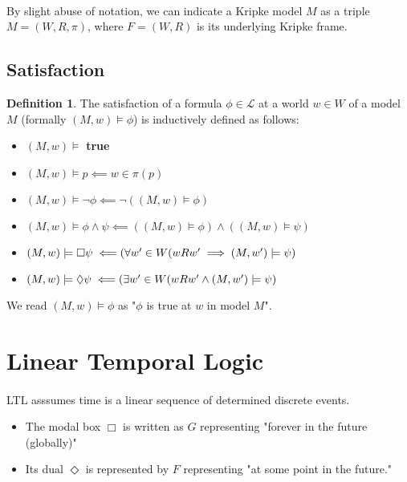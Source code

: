 \documentclass{article}
\theoremstyle{plain}
\theoremstyle{definition}
\newtheorem{defn}[thm]{Definition} %
\begin{document}
\begin{multicols}{2}
\paragraph{} By slight abuse of notation, we can indicate a Kripke model $M$ as a triple $M = (W, R, \pi)$, where $F = (W, R)$ is its underlying Kripke frame. 

\subsection{Satisfaction}

\begin{defn}The satisfaction of a formula $\phi\in\mathcal{L}$ at a world $w\in W$ of a model $M$ (formally $(M, w) \models \phi$) is inductively defined as follows:\end{defn}

\begin{itemize}
\item $(M, w) \models $ \textbf{true}
\item $(M, w) \models p \impliedby w \in \pi(p)$
\item $(M, w) \models \lnot\phi \impliedby \lnot((M, w)\models \phi)$
\item $(M, w) \models \phi \land \psi \impliedby ((M,w) \models \phi) \land ((M, w) \models \psi)$
\item $(M, w) \models \Box\psi \impliedby\\ (\forall w' \in W (w R w' \implies (M, w') \models \psi)$
\item $(M, w) \models \Diamond\psi \impliedby\\ (\exists w' \in W (w R w' \land (M, w') \models \psi)$
\end{itemize}

\noindent We read $(M, w) \models \phi$ as "$\phi$ is true at $w$ in model $M$".

\section{Linear Temporal Logic}

\paragraph{} LTL asssumes time is a linear sequence of determined discrete events. 

\begin{itemize}
\item The modal box $\Box$ is written as $G$ representing "forever in the future (globally)"
\item Its dual $\Diamond$ is represented by $F$ representing "at some point in the future."
\end{itemize}


\end{multicols}
\end{document}
